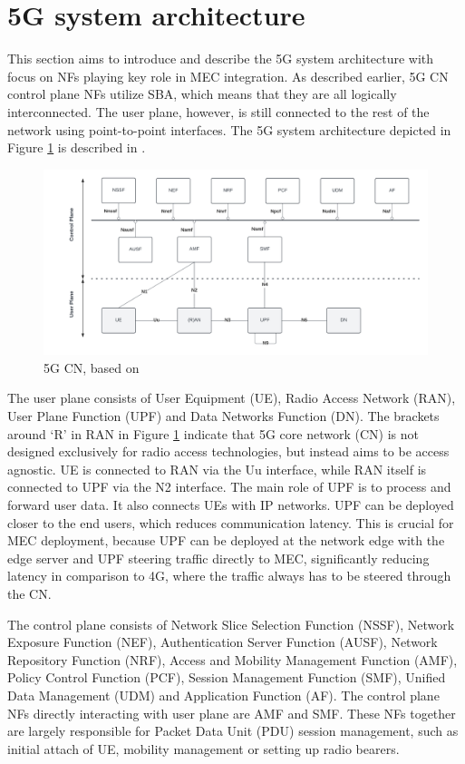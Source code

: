 \documentclass[12pt,a4paper,twoside]{report}
\begin{document}
\section{5G system architecture}
This section aims to introduce and describe the 5G system architecture with focus on NFs playing key role in MEC integration. As described earlier, 5G CN control plane NFs utilize SBA, which means that they are all logically interconnected. The user plane, however, is still connected to the rest of the network using point-to-point interfaces. The 5G system architecture depicted in Figure \ref{F:5G-arch} is described in \cite{ETSI:TS:5G}.

\begin{figure}[ht]
	\centering
	\includegraphics[width=\textwidth]{./images/5G-CN.png}
	\caption{5G CN, based on \cite{ETSI:TS:5G}}
	\label{F:5G-arch}
\end{figure}

The user plane consists of User Equipment (UE), Radio Access Network (RAN), User Plane Function (UPF) and Data Networks Function (DN). The brackets around ‘R’ in RAN in Figure \ref{F:5G-arch} indicate that 5G core network (CN) is not designed exclusively for radio access technologies, but instead aims to be access agnostic. UE is connected to RAN via the Uu interface, while RAN itself is connected to UPF via the N2 interface. The main role of UPF is to process and forward user data. It also connects UEs with IP networks. UPF can be deployed closer to the end users, which reduces communication latency. This is crucial for MEC deployment, because UPF can be deployed at the network edge with the edge server and UPF steering traffic directly to MEC, significantly reducing latency in comparison to 4G, where the traffic always has to be steered through the CN. \cite{rommer20195g}

The control plane consists of Network Slice Selection Function (NSSF), Network Exposure Function (NEF), Authentication Server Function (AUSF), Network Repository Function (NRF), Access and Mobility Management Function (AMF), Policy Control Function (PCF), Session Management Function (SMF), Unified Data Management (UDM) and Application Function (AF). The control plane NFs directly interacting with user plane are AMF and SMF. These NFs together are largely responsible for Packet Data Unit (PDU) session management, such as initial attach of UE, mobility management or setting up radio bearers. \cite{rommer20195g}
  
\end{document}
